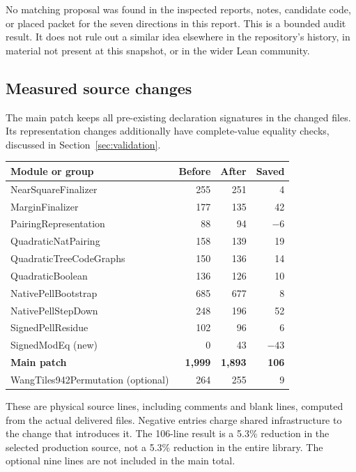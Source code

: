\documentclass[11pt,letterpaper]{article}
\begin{document}
No matching proposal was found in the inspected reports, notes, candidate
code, or placed packet for the seven directions in this report. This is a
bounded audit result. It does not rule out a similar idea elsewhere in the
repository's history, in material not present at this snapshot, or in the
wider Lean community.

\subsection{Measured source changes}

The main patch keeps all pre-existing declaration signatures in the changed
files. Its representation changes additionally have complete-value equality
checks, discussed in Section~\ref{sec:validation}.

\begin{center}
\small
\begin{tabularx}{\linewidth}{@{}Xrrr@{}}
\toprule
Module or group & Before & After & Saved\\
\midrule
NearSquareFinalizer & 255 & 251 & 4\\
MarginFinalizer & 177 & 135 & 42\\
PairingRepresentation & 88 & 94 & $-6$\\
QuadraticNatPairing & 158 & 139 & 19\\
QuadraticTreeCodeGraphs & 150 & 136 & 14\\
QuadraticBoolean & 136 & 126 & 10\\
NativePellBootstrap & 685 & 677 & 8\\
NativePellStepDown & 248 & 196 & 52\\
SignedPellResidue & 102 & 96 & 6\\
SignedModEq (new) & 0 & 43 & $-43$\\
\midrule
\textbf{Main patch} & \textbf{1,999} & \textbf{1,893} & \textbf{106}\\
\midrule
WangTiles942Permutation (optional) & 264 & 255 & 9\\
\bottomrule
\end{tabularx}
\end{center}

These are physical source lines, including comments and blank lines, computed
from the actual delivered files. Negative entries charge shared infrastructure
to the change that introduces it. The 106-line result is a 5.3\% reduction in
the selected production source, not a 5.3\% reduction in the entire library.
The optional nine lines are not included in the main total.
\end{document}
